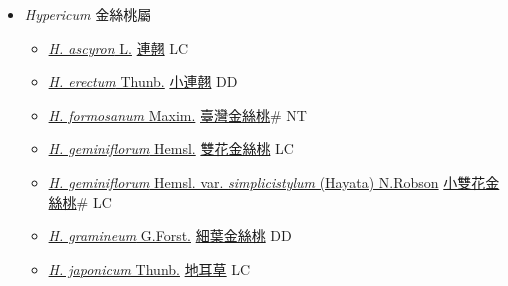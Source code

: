 
  \begin{itemize}
 \item[] \textit{Hypericum} 金絲桃屬
                    
  \begin{itemize}
        \item[] \href{http://www.theplantlist.org/tpl1.1/search?q=Hypericum+ascyron}{\textit{H. ascyron} L.}   \href{\detokenize{http://taibnet.sinica.edu.tw/chi/taibnet_species_list.php?T2=連翹&T2_new_value=true&fr=y}}{連翹} LC
        \item[] \href{http://www.theplantlist.org/tpl1.1/search?q=Hypericum+erectum}{\textit{H. erectum} Thunb.}   \href{\detokenize{http://taibnet.sinica.edu.tw/chi/taibnet_species_list.php?T2=小連翹&T2_new_value=true&fr=y}}{小連翹} DD
        \item[] \href{http://www.theplantlist.org/tpl1.1/search?q=Hypericum+formosanum}{\textit{H. formosanum} Maxim.}   \href{\detokenize{http://taibnet.sinica.edu.tw/chi/taibnet_species_list.php?T2=臺灣金絲桃&T2_new_value=true&fr=y}}{臺灣金絲桃}\# NT
        \item[] \href{http://www.theplantlist.org/tpl1.1/search?q=Hypericum+geminiflorum}{\textit{H. geminiflorum} Hemsl.}   \href{\detokenize{http://taibnet.sinica.edu.tw/chi/taibnet_species_list.php?T2=雙花金絲桃&T2_new_value=true&fr=y}}{雙花金絲桃} LC
        \item[] \href{http://www.theplantlist.org/tpl1.1/search?q=Hypericum+geminiflorum+var.+simplicistylum}{\textit{H. geminiflorum} Hemsl. var. \textit{simplicistylum} (Hayata) N.Robson}   \href{\detokenize{http://taibnet.sinica.edu.tw/chi/taibnet_species_list.php?T2=小雙花金絲桃&T2_new_value=true&fr=y}}{小雙花金絲桃}\# LC
        \item[] \href{http://www.theplantlist.org/tpl1.1/search?q=Hypericum+gramineum}{\textit{H. gramineum} G.Forst.}   \href{\detokenize{http://taibnet.sinica.edu.tw/chi/taibnet_species_list.php?T2=細葉金絲桃&T2_new_value=true&fr=y}}{細葉金絲桃} DD
        \item[] \href{http://www.theplantlist.org/tpl1.1/search?q=Hypericum+japonicum}{\textit{H. japonicum} Thunb.}   \href{\detokenize{http://taibnet.sinica.edu.tw/chi/taibnet_species_list.php?T2=地耳草&T2_new_value=true&fr=y}}{地耳草} LC

\end{itemize}
\end{itemize}
